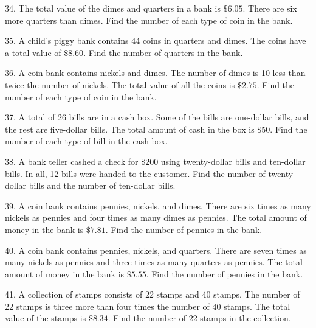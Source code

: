 \documentclass{ximera}
\begin{document}
\begin{exercise}
34. The total value of the dimes and quarters in a bank is $\$ 6.05$. There are six more quarters than dimes. Find the number of each type of coin in the bank.
\end{exercise}

\begin{exercise}
35. A child's piggy bank contains 44 coins in quarters and dimes. The coins have a total value of $\$ 8.60$. Find the number of quarters in the bank.
\end{exercise}

\begin{exercise}
36. A coin bank contains nickels and dimes. The number of dimes is 10 less than twice the number of nickels. The total value of all the coins is $\$ 2.75$. Find the number of each type of coin in the bank.
\end{exercise}

\begin{exercise}
37. A total of 26 bills are in a cash box. Some of the bills are one-dollar bills, and the rest are five-dollar bills. The total amount of cash in the box is $\$ 50$. Find the number of each type of bill in the cash box.
\end{exercise}

\begin{exercise}
38. A bank teller cashed a check for $\$ 200$ using twenty-dollar bills and ten-dollar bills. In all, 12 bills were handed to the customer. Find the number of twenty-dollar bills and the number of ten-dollar bills.
\end{exercise}

\begin{exercise}
39. A coin bank contains pennies, nickels, and dimes. There are six times as many nickels as pennies and four times as many dimes as pennies. The total amount of money in the bank is $\$ 7.81$. Find the number of pennies in the bank.
\end{exercise}

\begin{exercise}
40. A coin bank contains pennies, nickels, and quarters. There are seven times as many nickels as pennies and three times as many quarters as pennies. The total amount of money in the bank is $\$ 5.55$. Find the number of pennies in the bank.
\end{exercise}

\begin{exercise}
41. A collection of stamps consists of 22\textcent{} stamps and 40\textcent{} stamps. The number of 22\textcent{} stamps is three more than four times the number of 40\textcent{} stamps. The total value of the stamps is $\$ 8.34$. Find the number of 22\textcent{} stamps in the collection.
\end{exercise}
\end{document}
